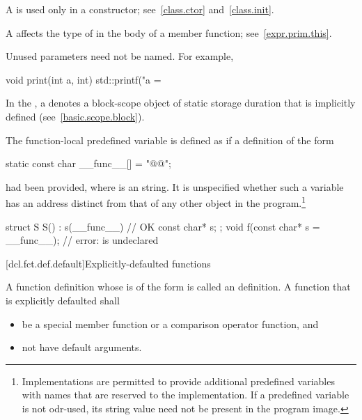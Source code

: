 \pnum
{}%
%
%
A
is used only in a constructor; see~\ref{class.ctor} and~\ref{class.init}.

\pnum
\begin{note}
A  affects the type of 
in the body of a member function; see~\ref{expr.prim.this}.
\end{note}

\pnum
\begin{note}
Unused parameters need not be named.
For example,

\begin{codeblock}
void print(int a, int) {
  std::printf("a = %
}
\end{codeblock}
\end{note}

\pnum
In the , a
 denotes a block-scope object of static
storage duration that is implicitly defined (see~\ref{basic.scope.block}).

\pnum
The function-local predefined variable  is
defined as if a definition of the form
\begin{codeblock}
static const char __func__[] = "@@";
\end{codeblock}
had been provided, where  is an  string.
It is unspecified whether such a variable has an address
distinct from that of any other object in the program.\footnote{Implementations are
permitted to provide additional predefined variables with names that are reserved to the
implementation. If a predefined variable is not
odr-used, its string value need not be present in the program image.}
\begin{example}
\begin{codeblock}
struct S {
  S() : s(__func__) { }             // OK
  const char* s;
};
void f(const char* s = __func__);   // error:  is undeclared
\end{codeblock}
\end{example}

[dcl.fct.def.default]{Explicitly-defaulted functions}%

\pnum
A function definition whose
is of the form
is called an  definition.
A function that is explicitly defaulted shall
\begin{itemize}
\item be a special member function or
a comparison operator function, and
\item not have default arguments.
\end{itemize}

